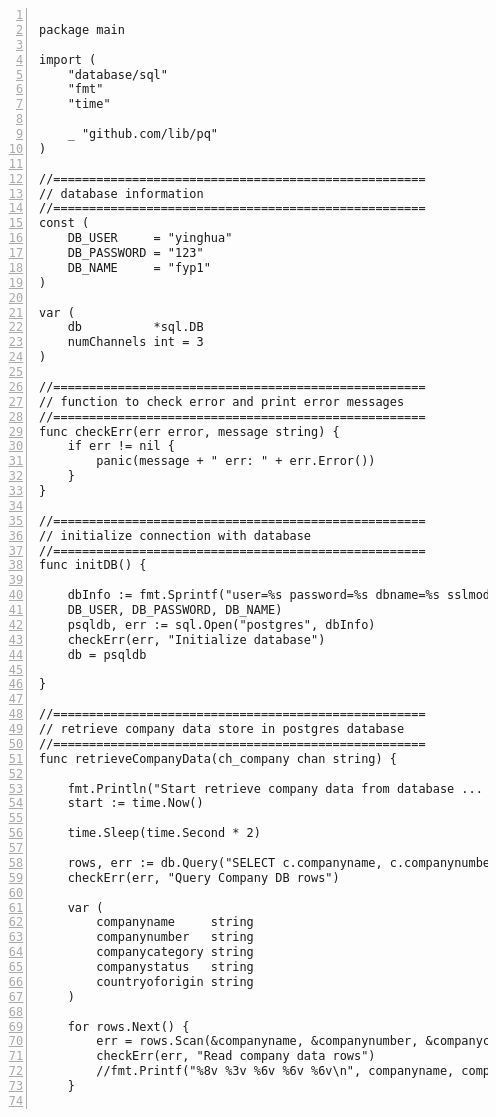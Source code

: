 \lstset{basicstyle=\ttfamily\tiny} 
\begin{lstlisting}[breaklines, frame=single, numbers=left, caption={Golang Concurrent Program Source Code}, label=commandline-02]

package main

import (
	"database/sql"
	"fmt"
	"time"
	
	_ "github.com/lib/pq"
)

//====================================================
// database information
//====================================================
const (
	DB_USER     = "yinghua"
	DB_PASSWORD = "123"
	DB_NAME     = "fyp1"
)

var (
	db          *sql.DB
	numChannels int = 3
)

//====================================================
// function to check error and print error messages
//====================================================
func checkErr(err error, message string) {
	if err != nil {
		panic(message + " err: " + err.Error())
	}
}

//====================================================
// initialize connection with database
//====================================================
func initDB() {

	dbInfo := fmt.Sprintf("user=%s password=%s dbname=%s sslmode=disable",
	DB_USER, DB_PASSWORD, DB_NAME)
	psqldb, err := sql.Open("postgres", dbInfo)
	checkErr(err, "Initialize database")
	db = psqldb

}

//====================================================
// retrieve company data store in postgres database
//====================================================
func retrieveCompanyData(ch_company chan string) {

	fmt.Println("Start retrieve company data from database ... ")
	start := time.Now()
	
	time.Sleep(time.Second * 2)
	
	rows, err := db.Query("SELECT c.companyname, c.companynumber, c.companycategory, c.companystatus, c.countryoforigin FROM companydata AS c ORDER BY c.companynumber limit 100;")
	checkErr(err, "Query Company DB rows")
	
	var (
		companyname     string
		companynumber   string
		companycategory string
		companystatus   string
		countryoforigin string
	)
	
	for rows.Next() {
		err = rows.Scan(&companyname, &companynumber, &companycategory, &companystatus, &countryoforigin)
		checkErr(err, "Read company data rows")
		//fmt.Printf("%8v %3v %6v %6v %6v\n", companyname, companynumber, companycategory, companystatus, countryoforigin)
	}
	

\end{lstlisting}
